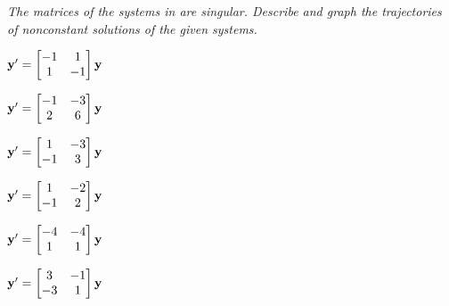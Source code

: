 %
\textsl{The matrices of the systems in
 are singular. Describe
and graph the trajectories of nonconstant solutions  of the given
systems.}
\begin{exerciselistTwoColumn}
\item\label{exer:10.4.36}\CGex $\mathbf{y}'=\begin{bmatrix}-1&1\\1&-1\end{bmatrix}\mathbf{y}$
\item\label{exer:10.4.37}\CGex $\mathbf{y}'=\begin{bmatrix}-1&-3\\2&6\end{bmatrix}\mathbf{y}$
\item\label{exer:10.4.38}\CGex $\mathbf{y}'=\begin{bmatrix}1&-3\\-1&3\end{bmatrix}\mathbf{y}$
\item\label{exer:10.4.39}\CGex $\mathbf{y}'=\begin{bmatrix}1&-2\\-1&2\end{bmatrix}\mathbf{y}$
\item\label{exer:10.4.40}\CGex $\mathbf{y}'=\begin{bmatrix}-4&-4\\1&1\end{bmatrix}\mathbf{y}$
\item\label{exer:10.4.41}\CGex $\mathbf{y}'=\begin{bmatrix}3&-1\\-3&1\end{bmatrix}\mathbf{y}$
\end{exerciselistTwoColumn}
